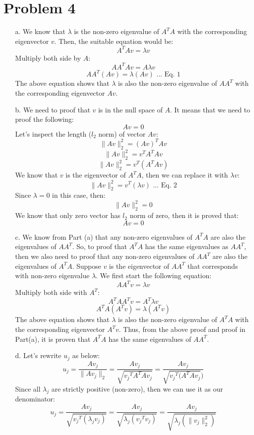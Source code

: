 \documentclass[twoside]{homework}
\begin{document}
\section*{Problem 4}
\begin{itemize}
    \item [a.] We know that $\lambda$ is the non-zero eigenvalue of $A^TA$ with the corresponding eigenvector $v$. Then, the suitable equation would be:
    $$A^TAv = {\lambda}v$$
    Multiply both side by $A$:
    $$AA^TAv = A{\lambda}v$$
    $$AA^T(Av) = {\lambda}(Av) \text{ ... Eq. 1}$$
    The above equation shows that $\lambda$ is also the non-zero eigenvalue of $AA^T$ with the corresponding eigenvector $Av$.
    \item[b.] We need to proof that $v$ is in the null space of $A$. It means that we need to proof the following:
    $$Av=0$$
    Let's inspect the length ($l_2$ norm) of vector $Av$:
    $$ \lVert Av \rVert_2^2 = (Av)^TAv$$
    $$ \lVert Av \rVert_2^2 = v^TA^TAv$$
    $$ \lVert Av \rVert_2^2 = v^T(A^TAv)$$
    We know that $v$ is the eigenvector of $A^TA$, then we can replace it with ${\lambda}v$:
    $$ \lVert Av \rVert_2^2 = v^T({\lambda}v) \text{ ... Eq. 2}$$
    Since ${\lambda}=0$ in this case, then:
    $$ \lVert Av \rVert_2^2 = 0$$
    We know that only zero vector has $l_2$ norm of zero, then it is proved that:
    $$Av=0$$
    \item[c.] We know from Part (a) that any non-zero eigenvalues of $A^TA$ are also the eigenvalues of $AA^T$. So, to proof that $A^TA$ has the same eigenvalues as $AA^T$, then we also need to proof that any non-zero eigenvalues of $AA^T$ are also the eigenvalues of $A^TA$. Suppose $v$ is the eigenvector of $AA^T$ that corresponds with non-zero eigenvalue $\lambda$. We first start the following equation:
    $$AA^Tv={\lambda}v$$
    Multiply both side with $A^T$:
    $$A^TAA^Tv=A^T{\lambda}v$$
    $$A^TA(A^Tv)={\lambda}(A^Tv)$$
    The above equation shows that $\lambda$ is also the non-zero eigenvalue of $A^TA$ with the corresponding eigenvector $A^Tv$. Thus, from the above proof and proof in Part(a), it is proven that $A^TA$ has the same eigenvalues of $AA^T$.
    \item[d.] Let's rewrite $u_j$ as below:
    $$u_j = \frac{Av_j}{\lVert Av_j \rVert_2} = \frac{Av_j}{\sqrt{{v_j}^TA^TAv_j}} = \frac{Av_j}{\sqrt{{v_j}^T(A^TAv_j})} $$
    Since all $\lambda_j$ are strictly positive (non-zero), then we can use it as our denominator:
    $$u_j = \frac{Av_j}{\sqrt{{v_j}^T({\lambda}_jv_j)}} = \frac{Av_j}{\sqrt{{\lambda}_j({v_j}^Tv_j)}} = \frac{Av_j}{\sqrt{{\lambda}_j(\lVert v_j \rVert_2^2)}} $$

\end{itemize}
\end{document}
